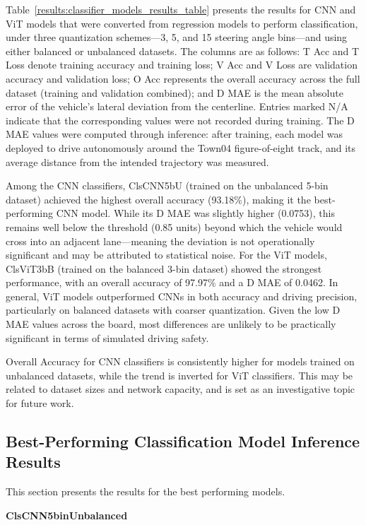 Table~\ref{results:classifier_models_results_table} presents the results for CNN and ViT models that were converted from regression models to perform classification, under three quantization schemes—3, 5, and 15 steering angle bins—and using either balanced or unbalanced datasets. The columns are as follows: T Acc and T Loss denote training accuracy and training loss; V Acc and V Loss are validation accuracy and validation loss; O Acc represents the overall accuracy across the full dataset (training and validation combined); and D MAE is the mean absolute error of the vehicle’s lateral deviation from the centerline. Entries marked N/A indicate that the corresponding values were not recorded during training. The D MAE values were computed through inference: after training, each model was deployed to drive autonomously around the Town04 figure-of-eight track, and its average distance from the intended trajectory was measured.

Among the CNN classifiers, ClsCNN5bU (trained on the unbalanced 5-bin dataset) achieved the highest overall accuracy (93.18\%), making it the best-performing CNN model. While its D MAE was slightly higher (0.0753), this remains well below the threshold (0.85 units) beyond which the vehicle would cross into an adjacent lane—meaning the deviation is not operationally significant and may be attributed to statistical noise. For the ViT models, ClsViT3bB (trained on the balanced 3-bin dataset) showed the strongest performance, with an overall accuracy of 97.97\% and a D MAE of 0.0462. In general, ViT models outperformed CNNs in both accuracy and driving precision, particularly on balanced datasets with coarser quantization. Given the low D MAE values across the board, most differences are unlikely to be practically significant in terms of simulated driving safety.

Overall Accuracy for CNN classifiers is consistently higher for models trained on unbalanced datasets, while the trend is inverted for ViT classifiers. This may be related to dataset sizes and network capacity, and is set as an investigative topic for future work.


\subsection{Best-Performing Classification Model Inference Results}

This section presents the results for the best performing models.


\textbf{ClsCNN5binUnbalanced}

